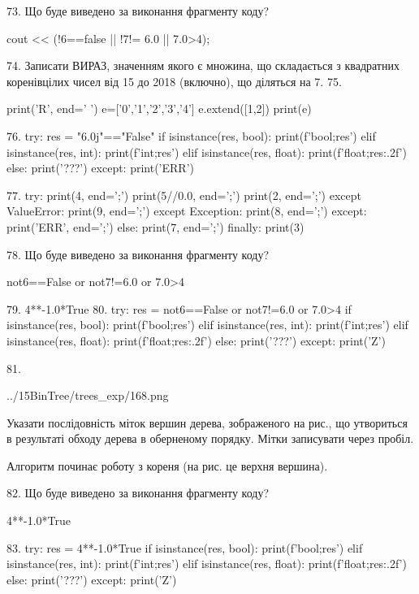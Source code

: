 \documentclass[11pt]{article}
\begin{document}
73. Що буде виведено за виконання фрагменту коду?

cout << (!6==false || !7!= 6.0 || 7.0>4);

74. 
Записати ВИРАЗ, значенням якого є множина, що складається з квадратних коренівцілих чисел від 15 до 2018 (включно), що діляться на 7.
75. 

print('R', end=' ')
e=['0','1','2','3','4']
e.extend([1,2])
print(e)


76. 
try:
    res = "6.0j"=="False"
    if isinstance(res, bool):
        print(f'bool;{res}')
    elif isinstance(res, int):
        print(f'int;{res}')
    elif isinstance(res, float):
        print(f'float;{res:.2f}')
    else:
        print('???')
except:
    print('ERR')

77. 
try:
    print(4, end=';')
    print(5//0.0, end=';')
    print(2, end=';')
except ValueError:
    print(9, end=';')
except Exception:
    print(8, end=';')
except:
    print('ERR', end=';')
else:
    print(7, end=';')
finally:
    print(3)

78. Що буде виведено за виконання фрагменту коду?

not6==False or not7!=6.0 or 7.0>4

79. 
4**-1.0*True
80. 
try:
    res = not6==False or not7!=6.0 or 7.0>4
    if isinstance(res, bool):
        print(f'bool;{res}')
    elif isinstance(res, int):
        print(f'int;{res}')
    elif isinstance(res, float):
        print(f'float;{res:.2f}')
    else:
        print('???')
except:
    print('Z')

81. 

\begin{center}
	{../15BinTree/trees_exp/168.png}
\end{center}
Указати послідовність міток вершин дерева, зображеного на рис., що утвориться в результаті обходу дерева в оберненому порядку. Мітки записувати через пробіл.\par Алгоритм починає роботу з кореня (на рис. це верхня вершина).

82. Що буде виведено за виконання фрагменту коду?

4**-1.0*True

83. 
try:
    res = 4**-1.0*True
    if isinstance(res, bool):
        print(f'bool;{res}')
    elif isinstance(res, int):
        print(f'int;{res}')
    elif isinstance(res, float):
        print(f'float;{res:.2f}')
    else:
        print('???')
except:
    print('Z')
\end{document}
